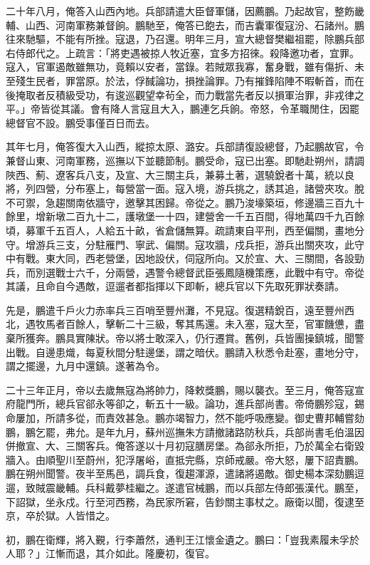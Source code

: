 \begin{pinyinscope}
二十年八月，俺答入山西內地。兵部請遣大臣督軍儲，因薦鵬。乃起故官，整飭畿輔、山西、河南軍務兼督餉。鵬馳至，俺答已飽去，而吉囊軍復寇汾、石諸州。鵬往來馳驅，不能有所挫。寇退，乃召還。明年三月，宣大總督樊繼祖罷，除鵬兵部右侍郎代之。上疏言：「將吏遇被掠人牧近塞，宜多方招徠。殺降邀功者，宜罪。寇入，官軍遏敵雖無功，竟賴以安者，當錄。若賊眾我寡，奮身戰，雖有傷折、未至殘生民者，罪當原。於法，俘馘論功，損挫論罪。乃有摧鋒陷陣不暇斬首，而在後掩取者反積級受功，有逡巡觀望幸茍全，而力戰當先者反以損軍治罪，非戎律之平。」帝皆從其議。會有降人言寇且大入，鵬連乞兵餉。帝怒，令革職閒住，因罷總督官不設。鵬受事僅百日而去。

其年七月，俺答復大入山西，縱掠太原、潞安。兵部請復設總督，乃起鵬故官，令兼督山東、河南軍務，巡撫以下並聽節制。鵬受命，寇已出塞。即馳赴朔州，請調陜西、薊、遼客兵八支，及宣、大三關主兵，兼募土著，選驍銳者十萬，統以良將，列四營，分布塞上，每營當一面。寇入境，游兵挑之，誘其追，諸營夾攻。脫不可禦，急趨關南依牆守，邀擊其困歸。帝從之。鵬乃浚壕築垣，修邊牆三百九十餘里，增新墩二百九十二，護墩堡一十四，建營舍一千五百間，得地萬四千九百餘頃，募軍千五百人，人給五十畝，省倉儲無算。疏請東自平刑，西至偏關，畫地分守。增游兵三支，分駐雁門、寧武、偏關。寇攻牆，戍兵拒，游兵出關夾攻，此守中有戰。東大同，西老營堡，因地設伏，伺寇所向。又於宣、大、三關間，各設勁兵，而別選戰士六千，分兩營，遇警令總督武臣張鳳隨機策應，此戰中有守。帝從其議，且命自今遇敵，逗遛者都指揮以下即斬，總兵官以下先取死罪狀奏請。

先是，鵬遣千戶火力赤率兵三百哨至豐州灘，不見寇。復選精銳百，遠至豐州西北，遇牧馬者百餘人，擊斬二十三級，奪其馬還。未入塞，寇大至，官軍饑憊，盡棄所獲奔。鵬具實陳狀。帝以將士敢深入，仍行遷賞。舊例，兵皆團操鎮城，聞警出戰。自邊患熾，每夏秋間分駐邊堡，謂之暗伏。鵬請入秋悉令赴塞，畫地分守，謂之擺邊，九月中還鎮。遂著為令。

二十三年正月，帝以去歲無寇為將帥力，降敕獎鵬，賜以襲衣。至三月，俺答寇宣府龍門所，總兵官郤永等卻之，斬五十一級。論功，進兵部尚書。帝倚鵬殄寇，錫命屢加，所請多從，而責效甚急。鵬亦竭智力，然不能呼吸應變。御史曹邦輔嘗劾鵬，鵬乞罷，弗允。是年九月，蘇州巡撫朱方請撤諸路防秋兵，兵部尚書毛伯溫因併撤宣、大、三關客兵。俺答遂以十月初寇膳房堡。為郤永所拒，乃於萬全右衛毀牆入。由順聖川至蔚州，犯浮屠峪，直抵完縣，京師戒嚴。帝大怒，屢下詔責鵬。鵬在朔州聞警。夜半至馬邑，調兵食，復趨渾源，遣諸將遏敵。御史楊本深劾鵬逗遛，致賊震畿輔。兵科戴夢桂繼之。遂遣官械鵬，而以兵部左侍郎張漢代。鵬至，下詔獄，坐永戍。行至河西務，為民家所窘，告鈔關主事杖之。廠衛以聞，復逮至京，卒於獄。人皆惜之。

初，鵬在衛輝，將入覲，行李蕭然，通判王江懷金遺之。鵬曰：「豈我素履未孚於人耶？」江慚而退，其介如此。隆慶初，復官。


\end{pinyinscope}
